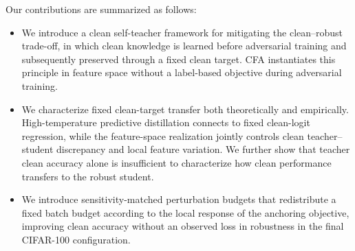Our contributions are summarized as follows:
\begin{itemize}

  \item We introduce a clean self-teacher framework for mitigating the
  clean--robust trade-off, in which clean knowledge is learned before
  adversarial training and subsequently preserved through a fixed clean
  target. CFA instantiates this principle in feature space without a
  label-based objective during adversarial training.

  \item We characterize fixed clean-target transfer both theoretically and
  empirically. High-temperature predictive distillation connects to fixed
  clean-logit regression, while the feature-space realization jointly
  controls clean teacher--student discrepancy and local feature variation.
  We further show that teacher clean accuracy alone is insufficient to
  characterize how clean performance transfers to the robust student.

  \item We introduce sensitivity-matched perturbation budgets that
  redistribute a fixed batch budget according to the local response of the
  anchoring objective, improving clean accuracy without an observed loss in
  robustness in the final CIFAR-100 configuration.

\end{itemize}